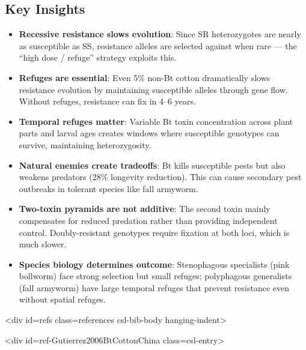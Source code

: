 \subsection{Key Insights}



\label{7549919537174593161}{}


\begin{itemize}
\item[1. ] \textbf{Recessive resistance slows evolution}: Since SR heterozygotes are  nearly as susceptible as SS, resistance alleles are selected against  when rare — the “high dose / refuge” strategy exploits this.


\item[2. ] \textbf{Refuges are essential}: Even 5\% non-Bt cotton dramatically slows  resistance evolution by maintaining susceptible alleles through gene  flow. Without refuges, resistance can fix in 4–6 years.


\item[3. ] \textbf{Temporal refuges matter}: Variable Bt toxin concentration across  plant parts and larval ages creates windows where susceptible  genotypes can survive, maintaining heterozygosity.


\item[4. ] \textbf{Natural enemies create tradeoffs}: Bt kills susceptible pests but  also weakens predators (28\% longevity reduction). This can cause  secondary pest outbreaks in tolerant species like fall armyworm.


\item[5. ] \textbf{Two-toxin pyramids are not additive}: The second toxin mainly  compensates for reduced predation rather than providing independent  control. Doubly-resistant genotypes require fixation at both loci,  which is much slower.


\item[6. ] \textbf{Species biology determines outcome}: Stenophagous specialists  (pink bollworm) face strong selection but small refuges; polyphagous  generalists (fall armyworm) have large temporal refuges that prevent  resistance even without spatial refuges.

\end{itemize}


<div id={\textquotedbl}refs{\textquotedbl} class={\textquotedbl}references csl-bib-body hanging-indent{\textquotedbl}>



<div id={\textquotedbl}ref-Gutierrez2006BtCottonChina{\textquotedbl} class={\textquotedbl}csl-entry{\textquotedbl}>




